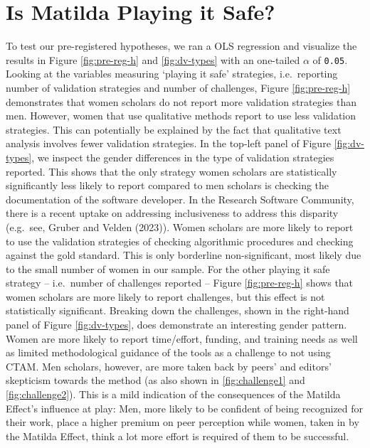\documentclass[
]{ccr}
\begin{document}
\hypertarget{is-matilda-playing-it-safe}{%
\section{Is Matilda Playing it Safe?}\label{is-matilda-playing-it-safe}}

To test our pre-registered hypotheses, we ran a OLS regression and
visualize the results in Figure \ref{fig:pre-reg-h} and
\ref{fig:dv-types} with an one-tailed \(\alpha\) of \texttt{0.05}.
Looking at the variables measuring `playing it safe' strategies,
i.e.~reporting number of validation strategies and number of challenges,
Figure \ref{fig:pre-reg-h} demonstrates that women scholars do not
report more validation strategies than men. However, women that use
qualitative methods report to use less validation strategies. This can
potentially be explained by the fact that qualitative text analysis
involves fewer validation strategies. In the top-left panel of Figure
\ref{fig:dv-types}, we inspect the gender differences in the type of
validation strategies reported. This shows that the only strategy women
scholars are statistically significantly less likely to report compared
to men scholars is checking the documentation of the software developer.
In the Research Software Community, there is a recent uptake on
addressing inclusiveness to address this disparity (e.g.~see, Gruber and
Velden (2023)). Women scholars are more likely to report to use the
validation strategies of checking algorithmic procedures and checking
against the gold standard. This is only borderline non-significant, most
likely due to the small number of women in our sample. For the other
playing it safe strategy -- i.e.~number of challenges reported -- Figure
\ref{fig:pre-reg-h} shows that women scholars are more likely to report
challenges, but this effect is not statistically significant. Breaking
down the challenges, shown in the right-hand panel of Figure
\ref{fig:dv-types}, does demonstrate an interesting gender pattern.
Women are more likely to report time/effort, funding, and training needs
as well as limited methodological guidance of the tools as a challenge
to not using CTAM. Men scholars, however, are more taken back by peers'
and editors' skepticism towards the method (as also shown in
\ref{fig:challenge1} and \ref{fig:challenge2}). This is a mild
indication of the consequences of the Matilda Effect's influence at
play: Men, more likely to be confident of being recognized for their
work, place a higher premium on peer perception while women, taken in by
the Matilda Effect, think a lot more effort is required of them to be
successful.
\end{document}
